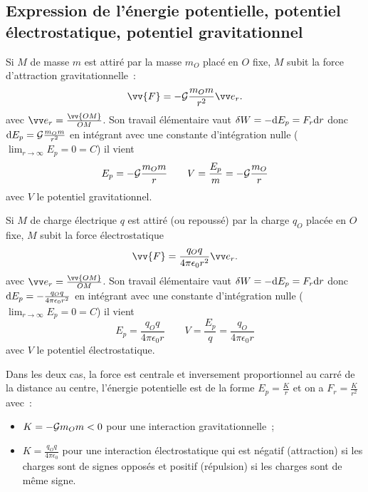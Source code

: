 \subsection{Expression de l'énergie potentielle, potentiel électrostatique, 
potentiel gravitationnel}
Si \(M\) de masse \(m\) est attiré par la masse \(m_O\) placé en \(O\) fixe, 
\(M\) subit la force d'attraction gravitationnelle~:
\begin{equation}
  \vv{F} = -\Gb \frac{m_O m}{r^2} \er.
\end{equation}
avec \(\er = \frac{\vv{OM}}{OM}\). Son travail élémentaire vaut \(\delta W = 
-\mathrm{d} E_p = F_r \mathrm{d} r\) donc \(\mathrm{d} E_p = \mathcal{G}\frac{m_O m}{r^2}\) en intégrant avec 
une constante d'intégration nulle (\(\lim_{r\to\infty} E_p = 0 = C\)) il vient
\begin{equation}
  E_p = -\mathcal{G} \frac{m_O m}{r} \qquad V = \frac{E_p}{m} = -\mathcal{G} \frac{m_O}{r}
\end{equation}
avec \(V\) le potentiel gravitationnel.

Si \(M\) de charge électrique \(q\) est attiré (ou repoussé) par la charge 
\(q_O\) placée en \(O\) fixe, \(M\) subit la force électrostatique
\begin{equation}
  \vv{F} = \frac{q_O q}{4\pi\epsilon_0r^2} \er.
\end{equation}
avec \(\er = \frac{\vv{OM}}{OM}\). Son travail élémentaire vaut \(\delta W = 
-\mathrm{d} E_p = F_r \mathrm{d} r\) donc \(\mathrm{d} E_p = - \frac{q_O q}{4\pi\epsilon_0r^2}\)
en intégrant avec une constante d'intégration nulle (\(\lim_{r\to\infty}
E_p = 0 = C\)) il vient
\begin{equation}
  E_p = \frac{q_O q}{4\pi\epsilon_0 r} \qquad V = \frac{E_p}{q} = 
  \frac{q_O}{4\pi\epsilon_0 r}
\end{equation}
avec \(V\) le potentiel électrostatique.

Dans les deux cas, la force est centrale et inversement proportionnel au carré 
de la distance au centre, l'énergie potentielle est de la forme \(E_p = 
\frac{K}{r}\) et on a \(F_r = \frac{K}{r^2}\) avec~:
\begin{itemize}
  \item \(K = -\mathcal{G} m_O m < 0\) pour une interaction gravitationnelle~;
  \item \(K = \frac{q_O q}{4\pi\epsilon_0}\) pour une interaction 
    électrostatique qui est négatif (attraction) si les charges sont de signes
    opposés et positif (répulsion) si les charges sont de même signe.
\end{itemize}
